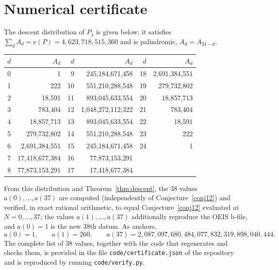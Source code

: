 \documentclass[11pt]{article}
\theoremstyle{plain}
\theoremstyle{definition}
\theoremstyle{remark}
\begin{document}
\section{Numerical certificate}\label{app:cert}

The descent distribution of $P_4$ is given below; it satisfies $\sum_d A_d=e(P)=
4{,}623{,}718{,}515{,}360$ and is palindromic, $A_d=A_{24-d}$.

\begin{center}\small
\begin{tabular}{r r @{\hskip 2em} r r @{\hskip 2em} r r}
\toprule
$d$ & $A_d$ & $d$ & $A_d$ & $d$ & $A_d$\\
\midrule
0 & 1                 & 9  & 245{,}184{,}671{,}458   & 18 & 2{,}691{,}384{,}551\\
1 & 222               & 10 & 551{,}210{,}288{,}548   & 19 & 279{,}732{,}802\\
2 & 18{,}591          & 11 & 893{,}045{,}633{,}554   & 20 & 18{,}857{,}713\\
3 & 783{,}404         & 12 & 1{,}048{,}272{,}112{,}322 & 21 & 783{,}404\\
4 & 18{,}857{,}713    & 13 & 893{,}045{,}633{,}554   & 22 & 18{,}591\\
5 & 279{,}732{,}802   & 14 & 551{,}210{,}288{,}548   & 23 & 222\\
6 & 2{,}691{,}384{,}551 & 15 & 245{,}184{,}671{,}458 & 24 & 1\\
7 & 17{,}418{,}677{,}384 & 16 & 77{,}873{,}153{,}291 &    & \\
8 & 77{,}873{,}153{,}291 & 17 & 17{,}418{,}677{,}384 &    & \\
\bottomrule
\end{tabular}
\end{center}

From this distribution and Theorem~\ref{thm:descent}, the $38$ values $a(0),\dots,a(37)$ are
computed (independently of Conjecture~\ref{conj12}) and verified, in exact rational arithmetic,
to equal Conjecture~\ref{conj12} evaluated at $N=0,\dots,37$; the values $a(1),\dots,a(37)$
additionally reproduce the OEIS b-file, and $a(0)=1$ is the new $38$th datum. As anchors,
\[
  a(0)=1,\qquad a(1)=260,\qquad a(37)=2{,}087{,}097{,}680{,}484{,}077{,}832{,}319{,}898{,}040{,}444 .
\]
The complete list of $38$ values, together with the code that regenerates and checks them, is
provided in the file \texttt{code/certificate.json} of the repository~\cite{REPO} and is
reproduced by running \texttt{code/verify.py}.
\end{document}
